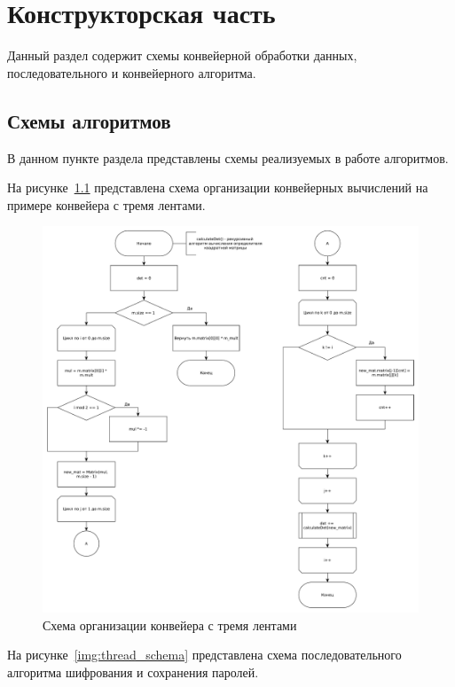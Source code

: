 \documentclass[12pt]{report}
\begin{document}
    \newpage
    
    \chapter{Конструкторская часть}
    Данный раздел содержит схемы конвейерной обработки данных, последовательного и конвейерного алгоритма.
    
    \section{Схемы алгоритмов}
    В данном пункте раздела представлены схемы реализуемых в работе алгоритмов.
    
    На рисунке~\ref{img:count_det} представлена схема организации конвейерных вычислений на примере конвейера с тремя лентами.
    \begin{figure}[H]
    	\centering
    	\includegraphics[width=1.00\linewidth]{img/count_det}
    	\caption{Схема организации конвейера с тремя лентами}
    	\label{img:count_det}
    \end{figure}
    
    На рисунке~\ref{img:thread_schema} представлена схема последовательного алгоритма шифрования и сохранения паролей.
    
\end{document}
